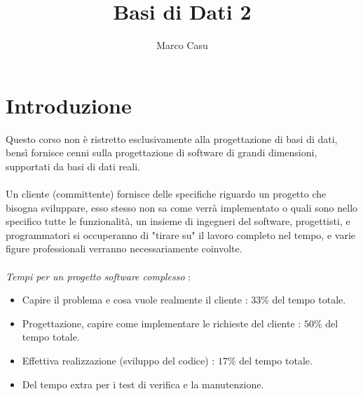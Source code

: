 \documentclass[12pt, letterpaper]{article}
\title{Basi di Dati 2}
\author{Marco Casu}
\date{\vspace{-5ex}}
\newcommand{\acc}{\\\hphantom{}\\}
\begin{document}
\maketitle
\begin{figure}[h]
\end{figure}
\newpage
\tableofcontents
\newpage
\section{Introduzione}
Questo corso non è ristretto esclusivamente alla progettazione di basi di dati, bensì fornisce
cenni sulla progettazione di software di grandi dimensioni, supportati da basi di dati reali.\acc
Un cliente (committente) fornisce delle specifiche riguardo un progetto che bisogna sviluppare,
esso stesso non sa come verrà implementato o quali sono nello specifico tutte le funzionalità,
un insieme di ingegneri del software, progettisti, e programmatori si occuperanno di "tirare su" il
lavoro completo nel tempo, e varie figure professionali verranno necessariamente coinvolte.\acc
\textit{Tempi per un progetto software complesso} :\begin{itemize}
    \item Capire il problema e cosa vuole realmente il cliente : \(33\%\) del tempo totale.
    \item Progettazione, capire come implementare le richieste del cliente : \(50\%\) del tempo totale.
    \item Effettiva realizzazione (sviluppo del codice) : \(17\%\) del tempo totale.
    \item Del tempo extra per i test di verifica e la manutenzione.
\end{itemize}
\end{document}

